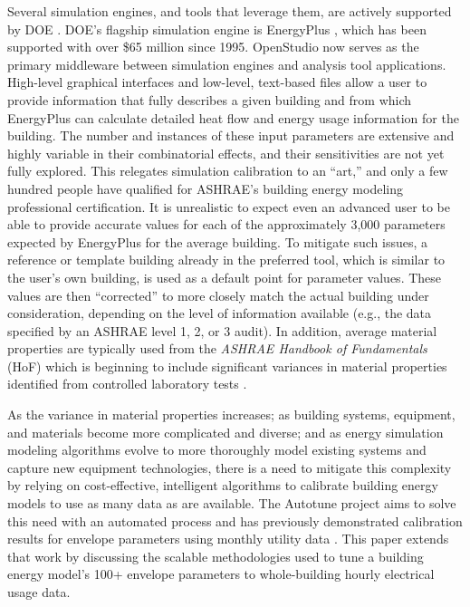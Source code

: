\documentclass[preprint, review, 12pt]{elsarticle}
\begin{document}
Several simulation engines, and tools that leverage them, are actively supported by DOE \cite{cit:doetools2012}. DOE’s flagship simulation engine is EnergyPlus \cite{cit:energyplus}, which has been supported with over \$65 million since 1995. OpenStudio \cite{cit:nrel2012} now serves as the primary middleware between simulation engines and analysis tool applications. High-level graphical interfaces and low-level, text-based files allow a user to provide information that fully describes a given building and from which EnergyPlus can calculate detailed heat flow and energy usage information for the building. The number and instances of these input parameters are extensive and highly variable in their combinatorial effects, and their sensitivities are not yet fully explored. This relegates simulation calibration to an ``art,'' and only a few hundred people have qualified for ASHRAE's building energy modeling professional certification. It is unrealistic to expect even an advanced user to be able to provide accurate values for each of the approximately 3,000 parameters expected by EnergyPlus for the average building. To mitigate such issues, a reference or template building already in the preferred tool, which is similar to the user's own building, is used as a default point for parameter values. These values are then ``corrected'' to more closely match the actual building under consideration, depending on the level of information available (e.g., the data specified by an ASHRAE level 1, 2, or 3 audit). In addition, average material properties are typically used from the \textit{ASHRAE Handbook of Fundamentals} (HoF) which is beginning to include significant variances in material properties identified from controlled laboratory tests \cite{cit:ashrae2013}.

As the variance in material properties increases; as building systems, equipment, and materials become more complicated and diverse; and as energy simulation modeling algorithms evolve to more thoroughly model existing systems and capture new equipment technologies, there is a need to mitigate this complexity by relying on cost-effective, intelligent algorithms to calibrate building energy models to use as many data as are available. The Autotune project \cite{cit:new2012} aims to solve this need with an automated process and has previously demonstrated calibration results for envelope parameters using monthly utility data \cite{cit:garrett2013}. This paper extends that work by discussing the scalable methodologies used to tune a building energy model's 100+ envelope parameters to whole-building hourly electrical usage data.
\end{document}
